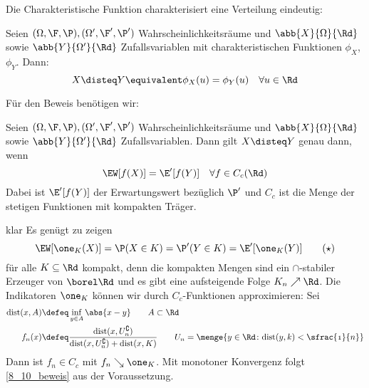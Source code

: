 Die Charakteristische Funktion charakterisiert eine Verteilung eindeutig:
\begin{proposition}
	\label{8_12_proposition} 
	Seien $(\Omega,\F,\P), (\Omega',\F',\P')$ Wahrscheinlichkeitsräume und $\abb{X}{\Omega}{\Rd}$ sowie $\abb{Y}{\Omega'}{\Rd}$ Zufallsvariablen mit charakteristischen Funktionen $\phi_X$, $\phi_Y$. Dann:
	\begin{equation*}
		X \disteq Y \equivalent \phi_X(u) = \phi_Y(u) \quad \forall u \in \Rd
	\end{equation*}
\end{proposition}

Für den Beweis benötigen wir:
\begin{lemma}
	\label{8_13_lemma} 
	Seien $(\Omega,\F,\P), (\Omega',\F',\P')$ Wahrscheinlichkeitsräume und $\abb{X}{\Omega}{\Rd}$ sowie $\abb{Y}{\Omega'}{\Rd}$ Zufallsvariablen. Dann gilt $X \disteq Y$ genau dann, wenn
	\begin{equation*}
		\EW[f(X)] = \E'[f(Y)] \quad \forall f \in C_c(\Rd)
	\end{equation*} 
	Dabei ist $\E'[f(Y)]$ der Erwartungswert bezüglich $\P'$ und $C_c$ ist die Menge der stetigen Funktionen mit kompakten Träger.
\end{lemma}
\begin{proof_equiv}
	\hinrichtung klar
	\rueckrichtung Es genügt zu zeigen
		\begin{equation}
			\EW[\one_K(X)] = \P(X \in K) = \P'(Y \in K) = \E'[\one_K(Y)] \label{8_10_beweis}\tag{$\star$}
		\end{equation}
		für alle $K \subseteq \Rd$ kompakt, denn die kompakten Mengen sind ein $\cap$-stabiler Erzeuger von $\borel\Rd$ und es gibt eine aufsteigende Folge $K_n \nearrow \Rd$. Die Indikatoren $\one_K$ können wir durch $C_c$-Funktionen approximieren: Sei
		\begin{equation*}
		\begin{aligned}
			\mathrm{dist}(x,A) &\defeq \inf_{y \in A}\abs{x-y} \quad \mit \quad A \subset \Rd\\
			f_n(x) &\defeq \frac{\mathrm{dist}(x, U_n^\complement)}{\mathrm{dist}(x,U_n^\complement) + \mathrm{dist}(x,K)} \quad \mit \quad U_n = \menge{y \in \Rd \colon \mathrm{dist}(y,k) < \sfrac{1}{n}}
		\end{aligned}
		\end{equation*}
		Dann ist $f_n \in C_c$ mit $f_n \searrow \one_K$. Mit monotoner Konvergenz folgt \eqref{8_10_beweis} aus der Voraussetzung.
\end{proof_equiv}

